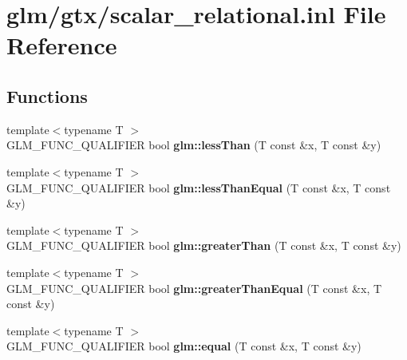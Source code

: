 \hypertarget{scalar__relational_8inl}{\section{glm/gtx/scalar\-\_\-relational.inl File Reference}
\label{scalar__relational_8inl}
}
\subsection*{Functions}
\begin{DoxyCompactItemize}
\item 
\hypertarget{namespaceglm_a6f2a3cef357dbf21b5fc90aded289ba1}{{\footnotesize template$<$typename T $>$ }\\G\-L\-M\-\_\-\-F\-U\-N\-C\-\_\-\-Q\-U\-A\-L\-I\-F\-I\-E\-R bool {\bfseries glm\-::less\-Than} (T const \&x, T const \&y)}\label{namespaceglm_a6f2a3cef357dbf21b5fc90aded289ba1}

\item 
\hypertarget{namespaceglm_a299eb11fb67637d37144dc0fcc6c6ff3}{{\footnotesize template$<$typename T $>$ }\\G\-L\-M\-\_\-\-F\-U\-N\-C\-\_\-\-Q\-U\-A\-L\-I\-F\-I\-E\-R bool {\bfseries glm\-::less\-Than\-Equal} (T const \&x, T const \&y)}\label{namespaceglm_a299eb11fb67637d37144dc0fcc6c6ff3}

\item 
\hypertarget{namespaceglm_ae567b870c79fb61cf069d489133eaf48}{{\footnotesize template$<$typename T $>$ }\\G\-L\-M\-\_\-\-F\-U\-N\-C\-\_\-\-Q\-U\-A\-L\-I\-F\-I\-E\-R bool {\bfseries glm\-::greater\-Than} (T const \&x, T const \&y)}\label{namespaceglm_ae567b870c79fb61cf069d489133eaf48}

\item 
\hypertarget{namespaceglm_a03e93d49cec76267c3e11fd68381639a}{{\footnotesize template$<$typename T $>$ }\\G\-L\-M\-\_\-\-F\-U\-N\-C\-\_\-\-Q\-U\-A\-L\-I\-F\-I\-E\-R bool {\bfseries glm\-::greater\-Than\-Equal} (T const \&x, T const \&y)}\label{namespaceglm_a03e93d49cec76267c3e11fd68381639a}

\item 
\hypertarget{namespaceglm_a9943cfbeef0a00a2becb541e9e3818ed}{{\footnotesize template$<$typename T $>$ }\\G\-L\-M\-\_\-\-F\-U\-N\-C\-\_\-\-Q\-U\-A\-L\-I\-F\-I\-E\-R bool {\bfseries glm\-::equal} (T const \&x, T const \&y)}\label{namespaceglm_a9943cfbeef0a00a2becb541e9e3818ed}


\end{DoxyCompactItemize}
